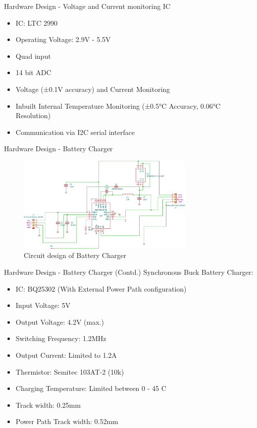 \documentclass[aspectratio=169]{beamer}
\begin{document}
		\begin{frame}{Hardware Design - Voltage and Current monitoring IC}
			
			\begin{itemize}
				\item IC: LTC 2990
				\item Operating Voltage: 2.9V - 5.5V	
				\item Quad input
				\item 14 bit ADC	
				\item Voltage (±0.1V accuracy) and Current Monitoring 
				\item Inbuilt Internal Temperature Monitoring (±0.5°C Accuracy, 0.06°C Resolution)
				\item Communication via I2C serial interface
			\end{itemize}
		\end{frame}
		
		
		
		\begin{frame}{Hardware Design - Battery Charger }
			\begin{figure}[h]
				\centering
				\includegraphics[width=0.77\textwidth]{diag/charg.pdf}
				\caption{Circuit design of Battery Charger}
				\label{fig:mesh1}
			\end{figure}
		\end{frame}
		
		
		\begin{frame}{Hardware Design - Battery Charger (Contd.)}
			Synchronous Buck Battery Charger:
			\begin{itemize}
				\item IC: BQ25302 (With External Power Path configuration)
				\item Input Voltage: 5V
				\item Output Voltage: 4.2V (max.)
				\item Switching Frequency: 1.2MHz
				\item Output Current: Limited to 1.2A
				\item Thermistor: Semitec 103AT-2 (10k\ohm)
				\item Charging Temperature: Limited between 0 - 45 C
				\item Track width: 0.25mm
				\item Power Path Track width: 0.52mm
			\end{itemize}
		\end{frame}
		
\end{document}
